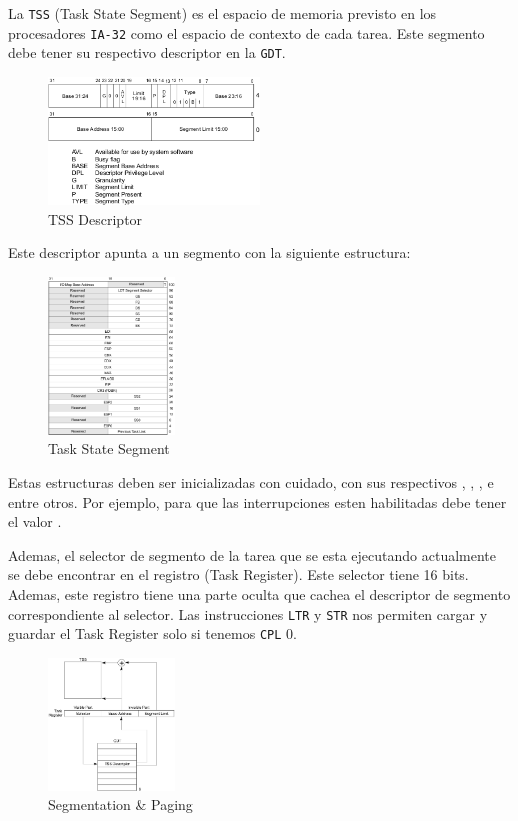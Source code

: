 La \texttt{TSS} (Task State Segment) es el espacio de memoria previsto en los procesadores \texttt{IA-32} como el espacio de contexto de cada tarea. Este segmento debe tener su respectivo descriptor en la \texttt{GDT}. 

\begin{figure}[H]
  \centering
    \includegraphics[width=0.5\textwidth]{images/tss_descriptor}
  \caption{TSS Descriptor}
\end{figure}

Este descriptor apunta a un segmento con la siguiente estructura:

\begin{figure}[H]
  \centering
    \includegraphics[width=0.3\textwidth]{images/tss}
  \caption{Task State Segment}
\end{figure}

Estas estructuras deben ser inicializadas con cuidado, con sus respectivos , , ,  e  entre otros. Por ejemplo, para que las interrupciones esten habilitadas  debe tener el valor .

Ademas, el selector de segmento de la tarea que se
esta ejecutando actualmente se debe encontrar en el registro  (Task Register). Este selector tiene 16 bits. Ademas, este registro tiene una parte oculta que cachea el descriptor de segmento correspondiente al selector. Las instrucciones \texttt{LTR} y \texttt{STR} nos permiten cargar y guardar el Task Register solo si tenemos \texttt{CPL} 0.

\begin{figure}[H]
  \centering
    \includegraphics[width=0.3\textwidth]{images/task_register}
  \caption{Segmentation \& Paging}
\end{figure}

